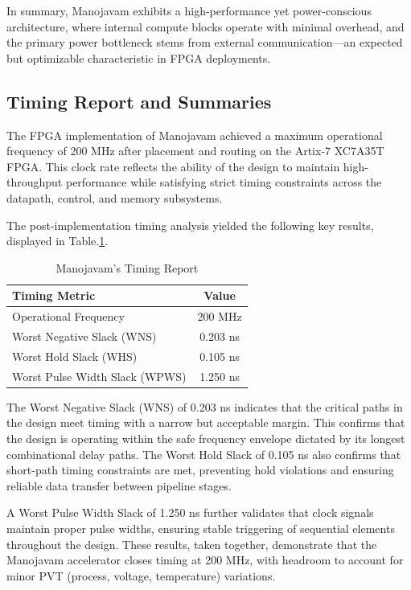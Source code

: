 In summary, Manojavam exhibits a high-performance yet power-conscious architecture, where internal compute blocks operate with minimal overhead, and the primary power bottleneck stems from external communication—an expected but optimizable characteristic in FPGA deployments.

\subsection{Timing Report and Summaries}
The FPGA implementation of Manojavam achieved a maximum operational frequency of 200 MHz after placement and routing on the Artix-7 XC7A35T FPGA. This clock rate reflects the ability of the design to maintain high-throughput performance while satisfying strict timing constraints across the datapath, control, and memory subsystems.

The post-implementation timing analysis yielded the following key results, displayed in Table.\ref{tab:manojavam-timing-report}.

\begin{table}[htb]
	\centering
	\fontsize{10}{12}\selectfont
	\caption{Manojavam's Timing Report}
	\label{tab:manojavam-timing-report}
	\begin{tabular}{|p{3cm}|c|}
		\hline
		\textbf{Timing Metric}& \textbf {Value}\\
		\hline
		Operational Frequency & 200 MHz\\\hline
		Worst Negative Slack (WNS) & 0.203 ns\\\hline
		Worst Hold Slack (WHS) & 0.105 ns\\\hline
		Worst Pulse Width Slack (WPWS) & 1.250 ns\\\hline
	\end{tabular}
\end{table} 

The Worst Negative Slack (WNS) of 0.203 ns indicates that the critical paths in the design meet timing with a narrow but acceptable margin. This confirms that the design is operating within the safe frequency envelope dictated by its longest combinational delay paths. The Worst Hold Slack of 0.105 ns also confirms that short-path timing constraints are met, preventing hold violations and ensuring reliable data transfer between pipeline stages.

A Worst Pulse Width Slack of 1.250 ns further validates that clock signals maintain proper pulse widths, ensuring stable triggering of sequential elements throughout the design. These results, taken together, demonstrate that the Manojavam accelerator closes timing at 200 MHz, with headroom to account for minor PVT (process, voltage, temperature) variations.

